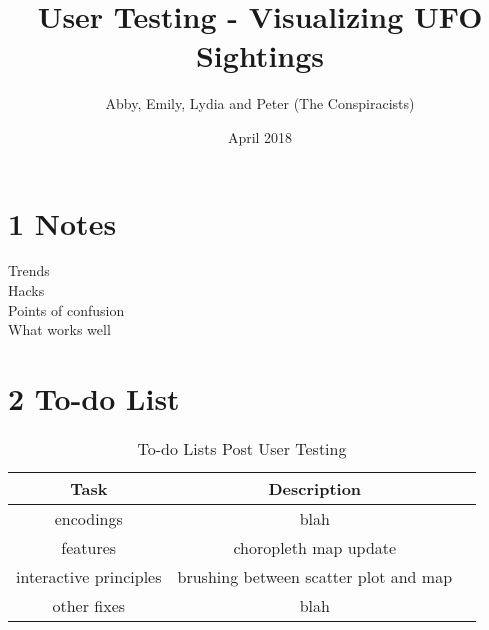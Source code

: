 \documentclass{neu_handout}
\title{User Testing - Visualizing UFO Sightings}
\author{Abby, Emily, Lydia and Peter (The Conspiracists)}
\date{April 2018}
\begin{document}
\section*{1 Notes}

Trends\\

Hacks\\

Points of confusion\\

What works well\\

\section*{2 To-do List}

\begin{table}[h]
\caption{To-do Lists Post User Testing} %
\centering %
\begin{tabular}{c c c} %
\hline\hline %
 Task & Description \\ [0.5ex]
\hline %

encodings &
blah \\[1ex] %

features & 
choropleth map update \\[1ex] %

interactive principles &
brushing between scatter plot and map \\

other fixes &
blah \\

\hline 
\end{tabular}
\label{tab:PPer}
\end{table}
\end{document}
